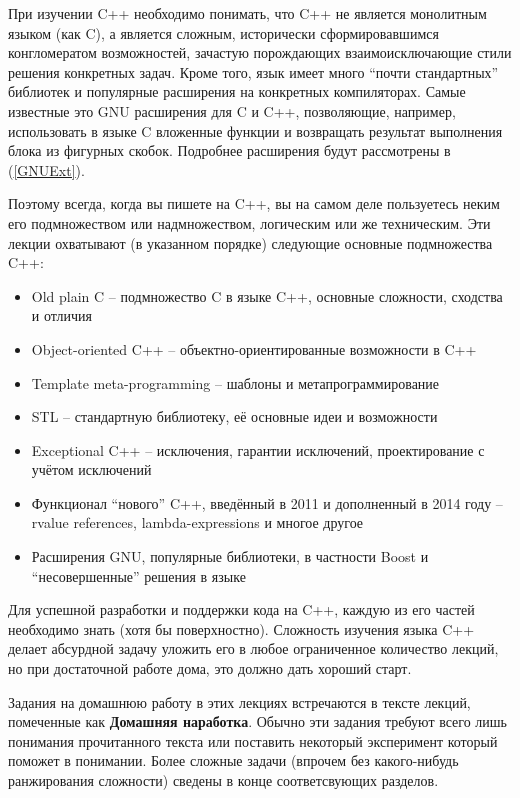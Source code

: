 \documentclass[a4paper,12pt,oneside]{article}
\begin{document}
При изучении C++ необходимо понимать, что C++ не является монолитным языком (как C), а является сложным, исторически сформировавшимся конгломератом возможностей, зачастую порождающих взаимоисключающие стили решения конкретных задач. Кроме того, язык имеет много ``почти стандартных'' библиотек и популярные расширения на конкретных компиляторах. Самые известные это GNU расширения для C и C++, позволяющие, например, использовать в языке C вложенные функции и возвращать результат выполнения блока из фигурных скобок. Подробнее расширения будут рассмотрены в (\ref{GNUExt}).

Поэтому всегда, когда вы пишете на C++, вы на самом деле пользуетесь неким его подмножеством или надмножеством, логическим или же техническим. Эти лекции охватывают (в указанном порядке) следующие основные подмножества C++:

\begin{itemize}
\item
Old plain C – подмножество C в языке C++, основные сложности, сходства и отличия
\item
Object-oriented C++ – объектно-ориентированные возможности в C++
\item
Template meta-programming – шаблоны и метапрограммирование
\item
STL – стандартную библиотеку, её основные идеи и возможности
\item
Exceptional C++ – исключения, гарантии исключений, проектирование с учётом исключений
\item
Функционал ``нового'' C++, введённый в 2011 и дополненный в 2014 году -- rvalue references, lambda-expressions и многое другое
\item
Расширения GNU, популярные библиотеки, в частности Boost и ``несовершенные'' решения в языке
\end{itemize}

Для успешной разработки и поддержки кода на C++, каждую из его частей необходимо знать (хотя бы поверхностно). Сложность изучения языка C++ делает абсурдной задачу уложить его в любое ограниченное количество лекций, но при достаточной работе дома, это должно дать хороший старт.

Задания на домашнюю работу в этих лекциях встречаются в тексте лекций, помеченные как \textbf{Домашняя наработка}. Обычно эти задания требуют всего лишь понимания прочитанного текста или поставить некоторый эксперимент который поможет в понимании. Более сложные задачи (впрочем без какого-нибудь ранжирования сложности) сведены в конце соответсвующих разделов.
\end{document}
